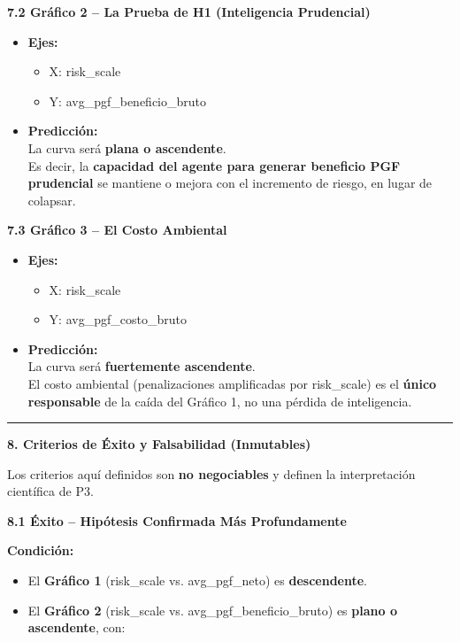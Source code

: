\textbf{7.2 Gráfico 2 -- La Prueba de H1 (Inteligencia Prudencial)}

\begin{itemize}
\item
  \textbf{Ejes:}

  \begin{itemize}
  \item
    X: risk\_scale
  \item
    Y: avg\_pgf\_beneficio\_bruto
  \end{itemize}
\item
  \textbf{Predicción:}\\
  La curva será \textbf{plana o ascendente}.\\
  Es decir, la \textbf{capacidad del agente para generar beneficio PGF
  prudencial} se mantiene o mejora con el incremento de riesgo, en lugar
  de colapsar.
\end{itemize}

\textbf{7.3 Gráfico 3 -- El Costo Ambiental}

\begin{itemize}
\item
  \textbf{Ejes:}

  \begin{itemize}
  \item
    X: risk\_scale
  \item
    Y: avg\_pgf\_costo\_bruto
  \end{itemize}
\item
  \textbf{Predicción:}\\
  La curva será \textbf{fuertemente ascendente}.\\
  El costo ambiental (penalizaciones amplificadas por risk\_scale) es el
  \textbf{único responsable} de la caída del Gráfico 1, no una pérdida
  de inteligencia.
\end{itemize}

\begin{center}\rule{0.5\linewidth}{0.5pt}\end{center}

\textbf{8. Criterios de Éxito y Falsabilidad (Inmutables)}

Los criterios aquí definidos son \textbf{no negociables} y definen la
interpretación científica de P3.

\textbf{8.1 Éxito -- Hipótesis Confirmada Más Profundamente}

\textbf{Condición:}

\begin{itemize}
\item
  El \textbf{Gráfico 1} (risk\_scale vs. avg\_pgf\_neto) es
  \textbf{descendente}.
\item
  El \textbf{Gráfico 2} (risk\_scale vs. avg\_pgf\_beneficio\_bruto) es
  \textbf{plano o ascendente}, con:
\end{itemize}

